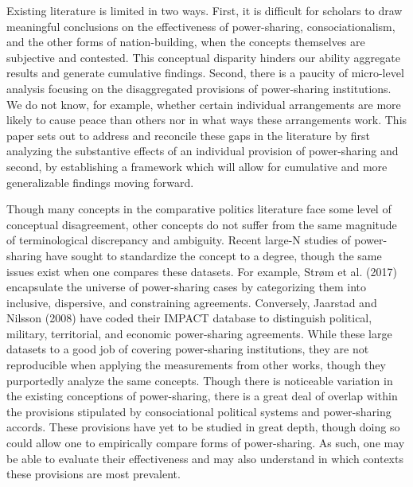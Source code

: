 \documentclass[12pt]{article}
\begin{document}
Existing literature is limited in two ways. First, it is difficult for scholars to draw meaningful conclusions on the effectiveness of power-sharing, consociationalism, and the other forms of nation-building, when the concepts themselves are subjective and contested. This conceptual disparity hinders our ability aggregate results and generate cumulative findings. Second, there is a paucity of micro-level analysis focusing on the disaggregated provisions of power-sharing institutions. We do not know, for example, whether certain individual arrangements are more likely to cause peace than others nor in what ways these arrangements work. This paper sets out to address and reconcile these gaps in the literature by first analyzing the substantive effects of an individual provision of power-sharing and second, by establishing a framework which will allow for cumulative and more generalizable findings moving forward. 

Though many concepts in the comparative politics literature face some level of conceptual disagreement, other concepts do not suffer from the same magnitude of terminological discrepancy and ambiguity. Recent large-N studies of power-sharing have sought to standardize the concept to a degree, though the same issues exist when one compares these datasets. For example, Strøm et al. (2017) encapsulate the universe of power-sharing cases by categorizing them into inclusive, dispersive, and constraining agreements. Conversely, Jaarstad and Nilsson (2008) have coded their IMPACT database to distinguish political, military, territorial, and economic power-sharing agreements. While these large datasets to a good job of covering power-sharing institutions, they are not reproducible when applying the measurements from other works, though they purportedly analyze the same concepts. Though there is noticeable variation in the existing conceptions of power-sharing, there is a great deal of overlap within the provisions stipulated by consociational political systems and power-sharing accords. These provisions have yet to be studied in great depth, though doing so could allow one to empirically compare forms of power-sharing. As such, one may be able to evaluate their effectiveness and may also understand in which contexts these provisions are most prevalent. 
\end{document}
